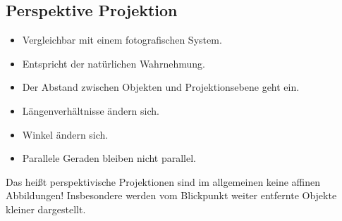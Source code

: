 		\subsection{Perspektive Projektion}
			\begin{itemize}
				\item Vergleichbar mit einem fotografischen System.
				\item Entspricht der natürlichen Wahrnehmung.
				\item Der Abstand zwischen Objekten und Projektionsebene geht ein.
				\item Längenverhältnisse ändern sich.
				\item Winkel ändern sich.
				\item Parallele Geraden bleiben nicht parallel.
			\end{itemize}
		
			Das heißt perspektivische Projektionen sind im allgemeinen keine affinen Abbildungen! Insbesondere werden vom Blickpunkt weiter entfernte Objekte kleiner dargestellt.
			
